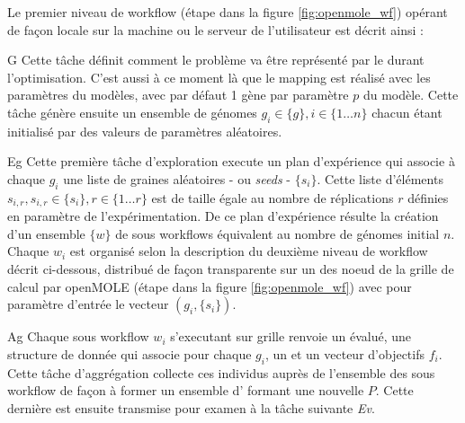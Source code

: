 Le premier niveau de workflow (étape  dans la figure \ref{fig:openmole_wf}) opérant de façon locale sur la machine ou le serveur de l'utilisateur est décrit ainsi :


\begin{myitemize}

\item[G] Cette tâche définit comment le problème va être représenté par le  durant l'optimisation. C'est aussi à ce moment là que le mapping est réalisé avec les paramètres du modèles, avec par défaut 1 gène par paramètre $p$ du modèle. Cette tâche génère ensuite un ensemble de génomes $g_i \in \{g\}, i \in \{1 \dotsc n\}$ chacun étant initialisé par des valeurs de paramètres aléatoires.

\item[Eg] Cette première tâche d'exploration execute un plan d'expérience qui associe à chaque  $g_i$ une liste de graines aléatoires  - ou \textit{seeds} - $\{s_i\}$. Cette liste d'éléments $s_{i,r} , s_{i,r} \in \{s_i\}, r \in \{1 \dotsc r\}$ est de taille égale au nombre de réplications $r$ définies en paramètre de l'expérimentation. De ce plan d'expérience résulte la création d'un ensemble $\{w\}$ de sous workflows équivalent au nombre de génomes initial $n$. Chaque $w_i$ est organisé selon la description du deuxième niveau de workflow décrit ci-dessous, distribué de façon transparente sur un des noeud de la grille de calcul par openMOLE (étape  dans la figure \ref{fig:openmole_wf}) avec pour paramètre d'entrée le vecteur $(g_i, \{s_i\})$.

\item[Ag] Chaque sous workflow $w_i$ s'executant sur grille renvoie un  évalué, une structure de donnée qui associe pour chaque  $g_i$, un  et un vecteur d'objectifs $f_i$. Cette tâche d'aggrégation collecte ces individus auprès de l'ensemble des sous workflow de façon à former un ensemble d' formant une nouvelle  $P$. Cette dernière est ensuite transmise pour examen à la tâche suivante \textit{Ev}.


\end{myitemize}
